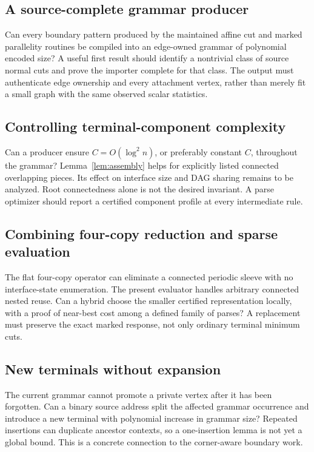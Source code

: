 \documentclass[11pt,a4paper]{article}
\theoremstyle{definition}
\theoremstyle{remark}
\begin{document}
\subsection{A source-complete grammar producer}
Can every boundary pattern produced by the maintained affine cut and marked parallelity routines be compiled into an edge-owned grammar of polynomial encoded size? A useful first result should identify a nontrivial class of source normal cuts and prove the importer complete for that class. The output must authenticate edge ownership and every attachment vertex, rather than merely fit a small graph with the same observed scalar statistics.

\subsection{Controlling terminal-component complexity}
Can a producer ensure $C=O(\log^2 n)$, or preferably constant $C$, throughout the grammar? Lemma~\ref{lem:assembly} helps for explicitly listed connected overlapping pieces. Its effect on interface size and DAG sharing remains to be analyzed. Root connectedness alone is not the desired invariant. A parse optimizer should report a certified component profile at every intermediate rule.

\subsection{Combining four-copy reduction and sparse evaluation}
The flat four-copy operator can eliminate a connected periodic sleeve with no interface-state enumeration. The present evaluator handles arbitrary connected nested reuse. Can a hybrid choose the smaller certified representation locally, with a proof of near-best cost among a defined family of parses? A replacement must preserve the exact marked response, not only ordinary terminal minimum cuts.

\subsection{New terminals without expansion}
The current grammar cannot promote a private vertex after it has been forgotten. Can a binary source address split the affected grammar occurrence and introduce a new terminal with polynomial increase in grammar size? Repeated insertions can duplicate ancestor contexts, so a one-insertion lemma is not yet a global bound. This is a concrete connection to the corner-aware boundary work.
\end{document}

